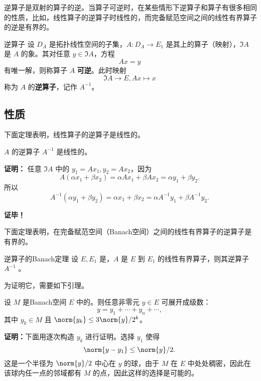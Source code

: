 

逆算子是双射的算子的逆。当算子可逆时，在某些情形下逆算子和算子有很多相同的性质，比如，线性算子的逆算子时线性的，而完备赋范空间之间的线性有界算子的逆是有界的。


\begin{definition}{逆算子}
设 $D_A$ 是拓扑线性空间的子集，$A:D_A\rightarrow E_1$ 是其上的算子（映射），$\Im A$ 是 $A$ 的象。其对任意 $y\in\Im A$，方程
\begin{equation}
Ax=y~
\end{equation}
 有唯一解，则称算子 $A$ \textbf{可逆}。此时映射
 \begin{equation}
 \Im A\rightarrow E,Ax\mapsto x~  
 \end{equation}
 称为 $A$ 的\textbf{逆算子}，记作 $A^{-1}$。

\end{definition}

\subsection{性质}
下面定理表明，线性算子的逆算子是线性的。

\begin{theorem}{}
 $A$ 的逆算子 $A^{-1}$ 是线性的。
\end{theorem}

\textbf{证明：}
任意 $\Im A$ 中的 $y_1=A x_1,y_2=Ax_2$，因为
\begin{equation}
A(\alpha x_1+\beta x_2)=\alpha Ax_1+\beta Ax_2=\alpha y_1+\beta y_2.~
\end{equation}
所以
\begin{equation}
A^{-1}(\alpha y_1+\beta y_2)=\alpha x_1+\beta x_2=\alpha A^{-1}y_1+\beta A^{-1}y_2.~
\end{equation}


\textbf{证毕！}

下面定理表明，在完备赋范空间（Banach空间）之间的线性有界算子的逆算子是有界的。

\begin{theorem}{逆算子的Banach定理}\label{the_InvOp_1}
设 $E,E_1$ 是，$A$ 是 $E$ 到 $E_1$ 的线性有界算子，则其逆算子 $A^{-1}$ 。
\end{theorem}

为证明它，需要如下引理。
\begin{lemma}{}\label{lem_InvOp_1}
设 $M$ 是Banach空间 $E$ 中的。则任意非零元 $y\in E$ 可展开成级数：
\begin{equation}
y=y_1+\cdots+y_n+\cdots,~
\end{equation}
其中 $y_k\in M$ 且 $\norm{y_k}\leq 3\norm{y}/2^k$。
\end{lemma}
\textbf{证明：}下面用逐次构造 $y_k$ 进行证明。选择 $y_1$ 使得
\begin{equation}
\norm{y-y_1}\leq\norm{y}/2.~
\end{equation}
这是一个半径为 $\norm{y}/2$ 中心在 $y$ 的球，由于 $M$ 在 $E$ 中处处稠密，因此在该球内任一点的邻域都有 $M$ 的点，因此这样的选择是可能的。

